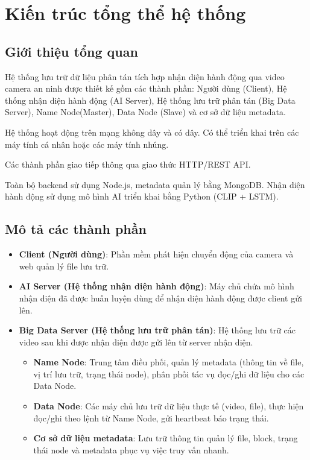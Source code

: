 \documentclass[../main.tex]{subfiles}
\begin{document}
\section{Kiến trúc tổng thể hệ thống}
\subsection{Giới thiệu tổng quan}

Hệ thống lưu trữ dữ liệu phân tán tích hợp nhận diện hành động qua video camera an ninh được thiết kế gồm các thành phần: Người dùng (Client), Hệ thống nhận diện hành động (AI Server), Hệ thống lưu trữ phân tán (Big Data Server), Name Node(Master), Data Node (Slave) và cơ sở dữ liệu metadata.

Hệ thống hoạt động trên mạng không dây và có dây. Có thể triển khai trên các máy tính cá nhân hoặc các máy tính nhúng.

Các thành phần giao tiếp thông qua giao thức HTTP/REST API.

Toàn bộ backend sử dụng Node.js, metadata quản lý bằng MongoDB. Nhận diện hành động sử dụng mô hình AI triển khai bằng Python (CLIP + LSTM).
\subsection{Mô tả các thành phần}
\begin{itemize}
    \item \textbf{Client (Người dùng)}: Phần mềm phát hiện chuyển động của camera và web quản lý file lưu trữ.
    \item \textbf{AI Server (Hệ thống nhận diện hành động)}: Máy chủ chứa mô hình nhận diện đã được huấn luyện dùng để nhận diện hành động được client gửi lên.
    \item \textbf{Big Data Server (Hệ thống lưu trữ phân tán)}: Hệ thống lưu trữ các video sau khi được nhận diện được gửi lên từ server nhận diện.
    \begin{itemize}
        \item \textbf{Name Node}: Trung tâm điều phối, quản lý metadata (thông tin về file, vị trí lưu trữ, trạng thái node), phân phối tác vụ đọc/ghi dữ liệu cho các Data Node.
        \item \textbf{Data Node}: Các máy chủ lưu trữ dữ liệu thực tế (video, file), thực hiện đọc/ghi theo lệnh từ Name Node, gửi heartbeat báo trạng thái.
        \item \textbf{Cơ sở dữ liệu metadata}: Lưu trữ thông tin quản lý file, block, trạng thái node và metadata phục vụ việc truy vấn nhanh.
    \end{itemize}
\end{itemize}
\end{document}
